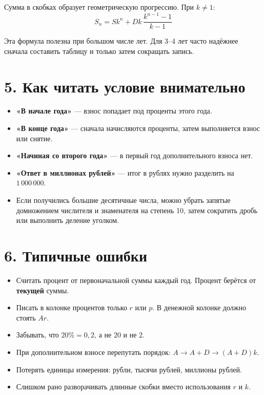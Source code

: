 \documentclass[a4paper,12pt]{article}
\newcommand{\key}[1]{\textcolor{darkaccent}{\textbf{#1}}}
\newcommand{\formula}[1]{\[\boxed{#1}\]}
\begin{document}
Сумма в скобках образует геометрическую прогрессию. При $k\ne1$:
\formula{S_n=Sk^n+Dk\,\frac{k^{n-1}-1}{k-1}}

Эта формула полезна при большом числе лет. Для 3--4 лет часто надёжнее сначала составить таблицу и только затем сокращать запись.

\clearpage
\section*{5. Как читать условие внимательно}

\begin{itemize}
  \item \key{«В начале года»} --- взнос попадает под проценты этого года.
  \item \key{«В конце года»} --- сначала начисляются проценты, затем выполняется взнос или снятие.
  \item \key{«Начиная со второго года»} --- в первый год дополнительного взноса нет.
  \item \key{«Ответ в миллионах рублей»} --- итог в рублях нужно разделить на $1\,000\,000$.
  \item Если получились большие десятичные числа, можно убрать запятые домножением числителя и знаменателя на степень 10, затем сократить дробь или выполнить деление уголком.
\end{itemize}

\section*{6. Типичные ошибки}

\begin{itemize}
  \item Считать процент от первоначальной суммы каждый год. Процент берётся от \key{текущей} суммы.
  \item Писать в колонке процентов только $r$ или $p$. В денежной колонке должно стоять \key{$A r$}.
  \item Забывать, что $20\%=0{,}2$, а не $20$ и не $2$.
  \item При дополнительном взносе перепутать порядок: $A\to A+D\to (A+D)k$.
  \item Потерять единицы измерения: рубли, тысячи рублей, миллионы рублей.
  \item Слишком рано разворачивать длинные скобки вместо использования $r$ и $k$.
\end{itemize}

\clearpage
\end{document}
